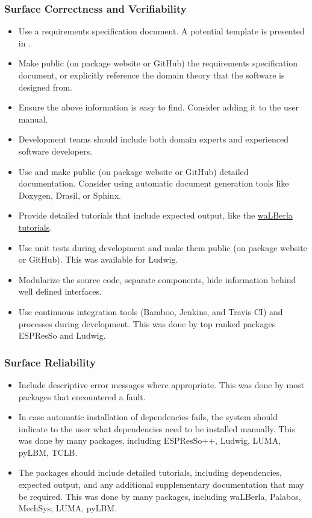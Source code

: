 \documentclass[12pt, notitlepage]{article}
\begin{document}
\subsubsection{Surface Correctness and Verifiability}

\begin{itemize}
	\item Use a requirements specification document. A potential template is presented in \citep{smith2005new}. 
	\item Make public (on package website or GitHub) the requirements specification document, or explicitly reference the domain theory that the software is designed from.
	\item Ensure the above information is easy to find. Consider adding it to the user manual. 
	\item Development teams should include both domain experts and experienced software developers.
	\item Use and make public (on package website or GitHub) detailed documentation. Consider using automatic document generation tools like Doxygen, Drasil, or Sphinx.
	\item Provide detailed tutorials that include expected output, like the \href{https://www.walberla.net/doxygen/index.html}{waLBerla tutorials}.
	\item Use unit tests during development and make them public (on package website or GitHub). This was available for Ludwig.
	\item Modularize the source code, separate components, hide information  behind well defined interfaces.
	\item Use continuous integration tools (Bamboo, Jenkins, and Travis CI) and processes during development. This was done by top ranked packages ESPResSo and Ludwig.
\end{itemize}

\subsubsection{Surface Reliability}

\begin{itemize}
	\item Include descriptive error messages where appropriate. This was done by most packages that encountered a fault.
	\item In case automatic installation of dependencies fails, the system should indicate to the user what dependencies need to be installed manually. This was done by many packages, including ESPResSo++, Ludwig, LUMA, pyLBM, TCLB.
	\item The packages should include detailed tutorials, including dependencies, expected output, and any additional supplementary documentation that may be required. This was done by many packages, including waLBerla, Palabos, MechSys, LUMA, pyLBM.
\end{itemize}
\end{document}
